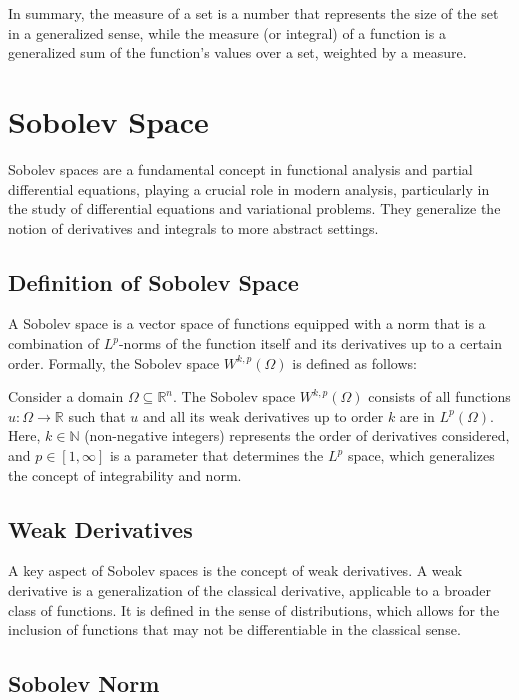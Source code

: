 \documentclass[a4paper,12pt]{article} %
\begin{document}
In summary, the measure of a set is a number that represents the size of the set in a generalized sense, while the measure (or integral) of a function is a generalized sum of the function's values over a set, weighted by a measure.


\newpage
\section{\textbf{Sobolev Space}}

Sobolev spaces are a fundamental concept in functional analysis and partial differential equations, playing a crucial role in modern analysis, particularly in the study of differential equations and variational problems. They generalize the notion of derivatives and integrals to more abstract settings.

\subsection{Definition of Sobolev Space}

A Sobolev space is a vector space of functions equipped with a norm that is a combination of $L^p$-norms of the function itself and its derivatives up to a certain order. Formally, the Sobolev space $W^{k,p}(\Omega)$ is defined as follows:

Consider a domain $\Omega \subseteq \mathbb{R}^n$. The Sobolev space $W^{k,p}(\Omega)$ consists of all functions $u: \Omega \rightarrow \mathbb{R}$ such that $u$ and all its weak derivatives up to order $k$ are in $L^p(\Omega)$. Here, $k \in \mathbb{N}$ (non-negative integers) represents the order of derivatives considered, and $p \in [1, \infty]$ is a parameter that determines the $L^p$ space, which generalizes the concept of integrability and norm.

\subsection{Weak Derivatives}

A key aspect of Sobolev spaces is the concept of weak derivatives. A weak derivative is a generalization of the classical derivative, applicable to a broader class of functions. It is defined in the sense of distributions, which allows for the inclusion of functions that may not be differentiable in the classical sense.

\subsection{Sobolev Norm}
\end{document}
